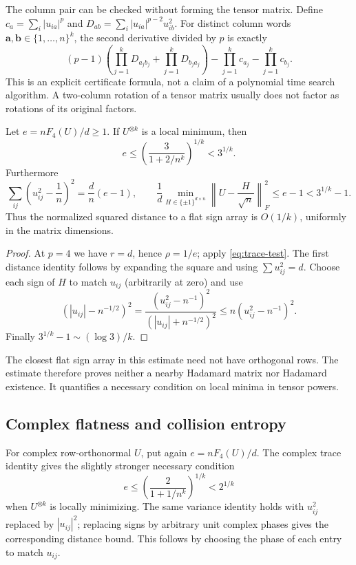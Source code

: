 The column pair can be checked without forming the tensor matrix.
Define $c_a=\sum_i|u_{ia}|^p$ and
$D_{ab}=\sum_i|u_{ia}|^{p-2}u_{ib}^2$. For distinct column words
$\mathbf a,\mathbf b\in\{1,\ldots,n\}^k$, the second derivative divided
by $p$ is exactly
\[
 (p-1)\left(\prod_{j=1}^kD_{a_jb_j}
             +\prod_{j=1}^kD_{b_ja_j}\right)
       -\prod_{j=1}^kc_{a_j}-\prod_{j=1}^kc_{b_j}.
\]
This is an explicit certificate formula, not a claim of a polynomial
time search algorithm. A two-column rotation of a tensor matrix
usually does not factor as rotations of its original factors.

\begin{corollary}
\label{cor:quartic-rate}
Let $e=nF_4(U)/d\ge1$. If $U^{\otimes k}$ is a local minimum, then
\[
 e\le \left(\frac{3}{1+2/n^k}\right)^{1/k}<3^{1/k}.
\]
Furthermore
\[
 \sum_{ij}\left(u_{ij}^2-\frac1n\right)^2
      =\frac dn(e-1),\qquad
 \frac1d\min_{H\in\{\pm1\}^{d\times n}}
       \left\|U-\frac H{\sqrt n}\right\|_F^2
      \le e-1<3^{1/k}-1.
\]
Thus the normalized squared distance to a flat sign array is
$O(1/k)$, uniformly in the matrix dimensions.
\end{corollary}

\begin{proof}
At $p=4$ we have $r=d$, hence $\rho=1/e$; apply
\eqref{eq:trace-test}. The first distance identity follows by expanding
the square and using $\sum u_{ij}^2=d$. Choose each sign of $H$ to
match $u_{ij}$ (arbitrarily at zero) and use
\[
 (|u_{ij}|-n^{-1/2})^2
 =\frac{(u_{ij}^2-n^{-1})^2}{(|u_{ij}|+n^{-1/2})^2}
 \le n(u_{ij}^2-n^{-1})^2.
\]
Finally $3^{1/k}-1\sim(\log3)/k$.
\end{proof}

The closest flat sign array in this estimate need not have orthogonal
rows. The estimate therefore proves neither a nearby Hadamard matrix
nor Hadamard existence. It quantifies a necessary condition on local
minima in tensor powers.

\subsection{Complex flatness and collision entropy}
For complex row-orthonormal $U$, put again $e=nF_4(U)/d$. The complex
trace identity gives the slightly stronger necessary condition
\[
 e\le\left(\frac{2}{1+1/n^k}\right)^{1/k}<2^{1/k}
\]
when $U^{\otimes k}$ is locally minimizing. The same variance identity
holds with $u_{ij}^2$ replaced by $|u_{ij}|^2$; replacing signs by
arbitrary unit complex phases gives the corresponding distance bound.
This follows by choosing the phase of each entry to match $u_{ij}$.

